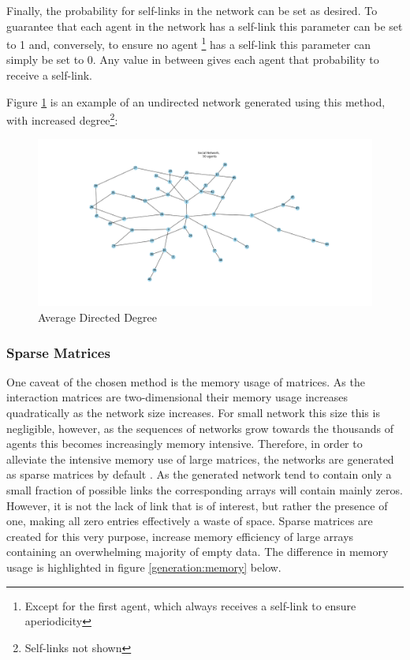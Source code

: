 \documentclass{article}
\begin{document}
\newpage

Finally, the probability for self-links in the network can be set as desired. To guarantee that each agent in the network has a self-link this parameter can be set to 1 and, conversely, to ensure no agent \footnote{Except for the first agent, which always receives a self-link to ensure aperiodicity} has a self-link this parameter can simply be set to 0. Any value in between gives each agent that probability to receive a self-link.

Figure \ref{network:random} is an example of an undirected network generated using this method, with increased degree\footnote{Self-links not shown}:
\begin{center}
    \begin{figure}[!htbp]
        \centering
        \includegraphics[width=1.15\textwidth]{ThesisKI/Images/NoneGraphRandom.png}
        \caption{Average Directed Degree}
        \label{network:random}
    \end{figure}
\end{center}

\newpage

\subsubsection{Sparse Matrices}

One caveat of the chosen method is the memory usage of matrices. As the interaction matrices are two-dimensional their memory usage increases quadratically as the network size increases. For small network this size this is negligible, however, as the sequences of networks grow towards the thousands of agents this becomes increasingly memory intensive. Therefore, in order to alleviate the intensive memory use of large matrices, the networks are generated as sparse matrices by default \cite{2020SciPy-NMeth}. As the generated network tend to contain only a small fraction of possible links the corresponding arrays will contain mainly zeros. However, it is not the lack of link that is of interest, but rather the presence of one, making all zero entries effectively a waste of space. Sparse matrices are created for this very purpose, increase memory efficiency of large arrays containing an overwhelming majority of empty data. The difference in memory usage is highlighted in figure \ref{generation:memory} below.
\end{document}
